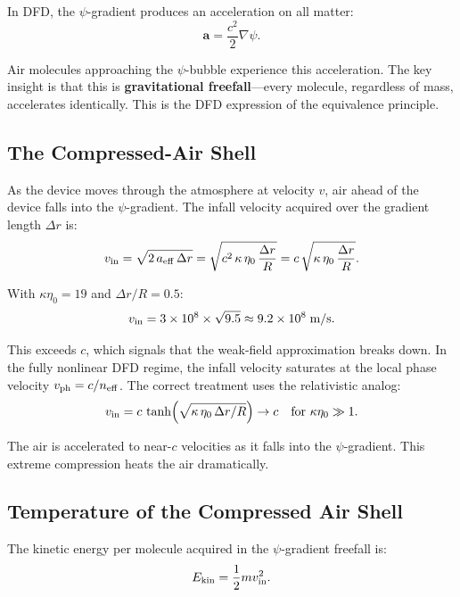 \documentclass[11pt]{article}
\newcommand{\neff}{n_{\rm eff}}
\newcommand{\vph}{v_{\rm ph}}
\begin{document}
In DFD, the $\psi$-gradient produces an acceleration on all matter:
\begin{equation}\label{eq:psi-accel}
\mathbf{a} = \frac{c^2}{2}\nabla\psi.
\end{equation}

Air molecules approaching the $\psi$-bubble experience this acceleration.
The key insight is that this is \textbf{gravitational freefall}---every
molecule, regardless of mass, accelerates identically. This is the DFD
expression of the equivalence principle.

\subsection{The Compressed-Air Shell}

As the device moves through the atmosphere at velocity $v$, air ahead
of the device falls into the $\psi$-gradient. The infall velocity acquired
over the gradient length $\Delta r$ is:
\begin{equation}\label{eq:infall-v}
v_{\rm in} = \sqrt{2\,a_{\rm eff}\,\Delta r}
  = \sqrt{c^2\,\kappa\,\eta_0\,\frac{\Delta r}{R}}
  = c\,\sqrt{\kappa\,\eta_0\,\frac{\Delta r}{R}}.
\end{equation}

With $\kappa\eta_0 = 19$ and $\Delta r/R = 0.5$:
\begin{equation}
v_{\rm in} = 3 \times 10^8 \times \sqrt{9.5} \approx 9.2 \times 10^8\;\text{m/s}.
\end{equation}

This exceeds $c$, which signals that the weak-field approximation breaks
down. In the fully nonlinear DFD regime, the infall velocity saturates at
the local phase velocity $\vph = c/\neff$. The correct treatment uses the
relativistic analog:
\begin{equation}\label{eq:infall-relativistic}
v_{\rm in} = c\,\tanh\!\left(\sqrt{\kappa\,\eta_0\,\Delta r/R}\right)
  \to c \quad \text{for } \kappa\eta_0 \gg 1.
\end{equation}

The air is accelerated to near-$c$ velocities as it falls into the
$\psi$-gradient. This extreme compression heats the air dramatically.

\subsection{Temperature of the Compressed Air Shell}

The kinetic energy per molecule acquired in the $\psi$-gradient freefall is:
\begin{equation}\label{eq:KE-per-molecule}
E_{\rm kin} = \frac{1}{2}m v_{\rm in}^2.
\end{equation}
\end{document}
